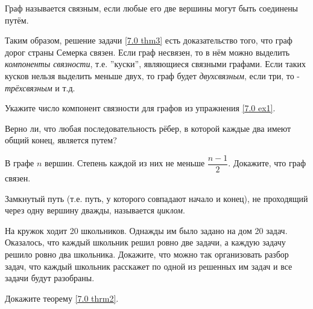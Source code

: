 \begin{dfn}
    Граф называется связным, если любые его две вершины могут быть соединены путём.
\end{dfn}

Таким образом, решение задачи \ref{7.0 thm3} есть доказательство того, что граф дорог страны Семерка связен. Если граф несвязен, то в нём можно выделить \textit{компоненты связности}, т.е. ''куски'', являющиеся связными графами. Если таких кусков нельзя выделить меньше двух, то граф будет \textit{двухсвязным}, если три, то - \textit{трёхсвязным} и т.д.

\begin{ex}
Укажите число компонент связности для графов из упражнения \ref{7.0 ex1}.
\end{ex}

\begin{thm}
    Верно ли, что любая последовательность рёбер, в которой каждые два имеют общий конец, является путем?
\end{thm}

\begin{thm}
    В графе $n$ вершин. Степень каждой из них не меньше $\dfrac{n - 1}{2}$. Докажите, что граф связен.
\end{thm}

\begin{dfn}
    Замкнутый путь (т.е. путь, у которого совпадают начало и конец), не проходящий через одну вершину дважды, называется \textit{циклом}.
\end{dfn}

\begin{thm}
    На кружок ходит 20 школьников. Однажды им было задано на дом 20 задач. Оказалось, что каждый школьник решил ровно две задачи, а каждую задачу решило ровно два школьника. Докажите, что можно так организовать разбор задач, что каждый школьник расскажет по одной из решенных им задач и все задачи будут разобраны.
\end{thm}


\begin{thm}
Докажите теорему \ref{7.0 thrm2}.
\end{thm}

